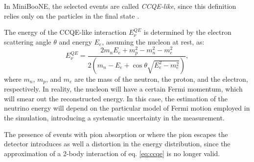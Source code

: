 In MiniBooNE, the selected events are called \emph{CCQE-like}, since this definition relies only on the particles in the final state \cite{Katori:2013nca}. 

The energy of the CCQE-like interaction $E_{\nu}^{QE}$ is determined by the electron scattering angle $\theta$ and energy $E_e$, assuming the nucleon at rest, as:
\begin{equation}
    E_{\nu}^{QE} = \frac{2m_n E_e + m_p^2- m_n^2 - m_e^2}{2(m_n - E_e + \cos\theta\sqrt{E_e^2-m_e^2})},\label{eq:ccqe}
\end{equation}
where $m_n$, $m_p$, and $m_e$ are the mass of the neutron, the proton, and the electron, respectively. 
In reality, the nucleon will have a certain Fermi momentum, which will smear out the reconstructed energy. In this case, the estimation of the neutrino energy will depend on the particular model of Fermi motion employed in the simulation, introducing a systematic uncertainty in the measurement.

The presence of events with pion absorption or where the pion escapes the detector introduces as well a distortion in the energy distribution, since the approximation of a 2-body interaction of eq. \ref{eq:ccqe} is no longer valid.


